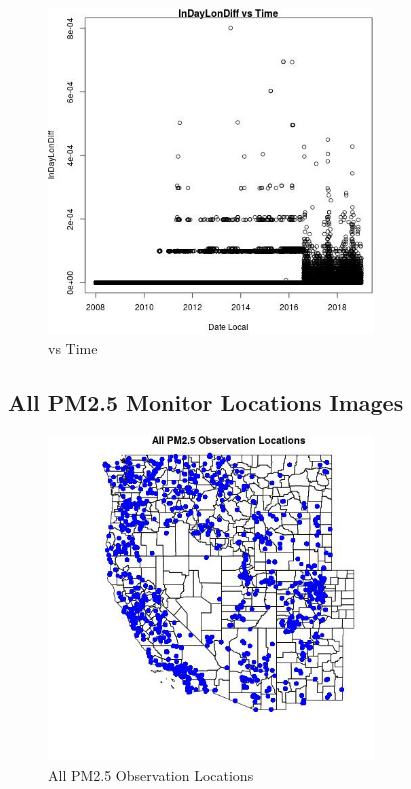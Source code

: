 \begin{figure} 
\centering  
\includegraphics[width=0.77\textwidth]{Code_Outputs/Report_PM25_Step4_part_e_de_duplicated_aves_prioritize_24hr_obs_ML_input_InDayLonDiffvDate_Local.jpg} 
\caption{\label{fig:Report_PM25_Step4_part_e_de_duplicated_aves_prioritize_24hr_obs_ML_inputInDayLonDiffvDate_Local}vs Time} 
\end{figure} 
 

\subsection{All PM2.5 Monitor Locations Images} 
 

\begin{figure} 
\centering  
\includegraphics[width=0.77\textwidth]{Code_Outputs/Report_PM25_Step4_part_e_de_duplicated_aves_prioritize_24hr_obs_ML_input_PlotLoc0.jpg} 
\caption{\label{fig:Report_PM25_Step4_part_e_de_duplicated_aves_prioritize_24hr_obs_ML_inputPlotLoc0}All PM2.5 Observation Locations} 
\end{figure} 
 

